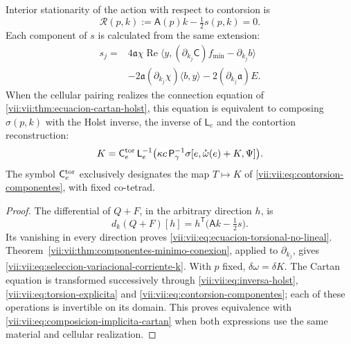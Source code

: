 \begin{proposition}
\label{vii:vii:prop:ecuacion-torsional-no-lineal}
Interior stationarity of the action with respect to contorsion is
\begin{equation}
 \mathcal R(p,k):=\mathsf A(p)k-\tfrac12s(p,k)=0.
 \label{vii:vii:eq:ecuacion-torsional-no-lineal}
\end{equation}
Each component of \(s\) is calculated from the same extension:
\begin{equation}
 \begin{split}
 s_j={}&4\mathfrak a\chi\operatorname{Re}
       \langle y,(\partial_{k_j}\mathsf C)f_{\min}
                         -\partial_{k_j}b\rangle\\
 &-2\mathfrak a(\partial_{k_j}\chi)\langle b,y\rangle
       -2(\partial_{k_j}\mathfrak a)E.
 \end{split}
 \label{vii:vii:eq:seleccion-variacional-corriente-k}
\end{equation}
When the cellular pairing realizes the connection equation of
\ref{vii:vii:thm:ecuacion-cartan-holst}, this equation is equivalent to composing
\(\sigma(p,k)\) with the Holst inverse, the inverse of
\(\mathsf L_e\) and the contortion reconstruction:
\begin{equation}
 K=\mathsf C_e^{\rm tor}\,\mathsf L_e^{-1}
           \bigl(\kappa c\,\mathsf P_\gamma^{-1}
             \sigma[e,\mathring\omega(e)+K,\Psi]\bigr).
 \label{vii:vii:eq:composicion-implicita-cartan}
\end{equation}
The symbol \(\mathsf C_e^{\rm tor}\) exclusively designates the
map \(T\mapsto K\) of
\eqref{vii:vii:eq:contorsion-componentes}, with fixed co-tetrad.
\end{proposition}

\begin{proof}
The differential of \(Q+F\), in the arbitrary direction \(h\), is
\[
 d_k(Q+F)[h]
   =h^{\mathsf T}\bigl(\mathsf A k-\tfrac12s\bigr).
\]
Its vanishing in every direction proves
\eqref{vii:vii:eq:ecuacion-torsional-no-lineal}.
Theorem~\ref{vii:vii:thm:componentes-minimo-conexion}, applied to
\(\partial_{k_j}\), gives
\eqref{vii:vii:eq:seleccion-variacional-corriente-k}. With \(p\) fixed,
\(\delta\omega=\delta K\). The Cartan equation is transformed
successively through \eqref{vii:vii:eq:inversa-holst},
\eqref{vii:vii:eq:torsion-explicita} and
\eqref{vii:vii:eq:contorsion-componentes}; each of these operations
is invertible on its domain. This proves equivalence with
\eqref{vii:vii:eq:composicion-implicita-cartan} when both expressions
use the same material and cellular realization.
\end{proof}

